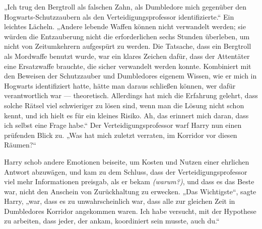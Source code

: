 „Ich trug den Bergtroll als falschen Zahn, als Dumbledore mich gegenüber den Hogwarts-Schutzzaubern als den Verteidigungsprofessor identifizierte.“
Ein leichtes Lächeln.
„Andere lebende Waffen können nicht verwandelt werden; sie würden die Entzauberung nicht die erforderlichen sechs Stunden überleben, um nicht von Zeitumkehrern aufgespürt zu werden. Die Tatsache, dass ein Bergtroll als Mordwaffe benutzt wurde, war ein klares Zeichen dafür, dass der Attentäter eine Ersatzwaffe brauchte, die sicher verwandelt werden konnte. Kombiniert mit den Beweisen der Schutzzauber und Dumbledores eigenem Wissen, wie er mich in Hogwarts identifiziert hatte, hätte man daraus schließen können, wer dafür verantwortlich war — theoretisch. Allerdings hat mich die Erfahrung gelehrt, dass solche Rätsel viel schwieriger zu lösen sind, wenn man die Lösung nicht schon kennt, und ich hielt es für ein kleines Risiko. Ah, das erinnert mich daran, dass ich selbst eine Frage habe.“
Der Verteidigungsprofessor warf Harry nun einen prüfenden Blick zu.
„Was hat mich zuletzt verraten, im Korridor vor diesen Räumen?“

Harry schob andere Emotionen beiseite, um Kosten und Nutzen einer ehrlichen Antwort abzuwägen, und kam zu dem Schluss, dass der Verteidigungsprofessor viel mehr Informationen preisgab, als er bekam \emph{(warum?)}, und dass es das Beste war, nicht den Anschein von Zurückhaltung zu erwecken.
„Das Wichtigste“, sagte Harry, „war, dass es zu unwahrscheinlich war, dass alle zur gleichen Zeit in Dumbledores Korridor angekommen waren. Ich habe versucht, mit der Hypothese zu arbeiten, dass jeder, der ankam, koordiniert sein musste, auch du.“

